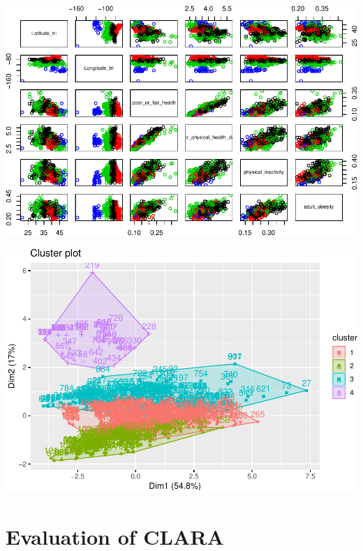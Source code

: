\documentclass[12pt,twoside]{amherstthesis}
\begin{document}
  \begin{center}\includegraphics{Comps_Proj_files/figure-latex/unnamed-chunk-7-1} \end{center}
  
  \begin{Shaded}
  \begin{Highlighting}[]
  \OperatorTok{::}
  \end{Highlighting}
  \end{Shaded}
  
  \begin{center}\includegraphics{Comps_Proj_files/figure-latex/unnamed-chunk-8-1} \end{center}
  
  \section{Evaluation of CLARA}\label{evaluation-of-clara}
  
\end{document}
